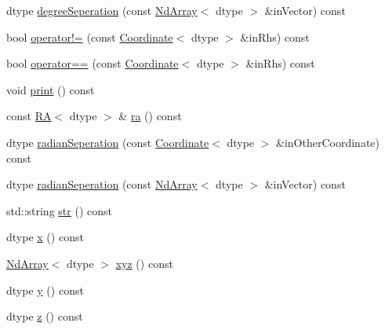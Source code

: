 \begin{DoxyCompactItemize}
\item 
dtype \mbox{\hyperlink{class_num_c_1_1_coordinates_1_1_coordinate_a0623947beab45b718c7da4d3b66ef0b6}{degree\+Seperation}} (const \mbox{\hyperlink{class_num_c_1_1_nd_array}{Nd\+Array}}$<$ dtype $>$ \&in\+Vector) const
\item 
bool \mbox{\hyperlink{class_num_c_1_1_coordinates_1_1_coordinate_a470632051f16f26dc976f5d8d0c24ac5}{operator!=}} (const \mbox{\hyperlink{class_num_c_1_1_coordinates_1_1_coordinate}{Coordinate}}$<$ dtype $>$ \&in\+Rhs) const
\item 
bool \mbox{\hyperlink{class_num_c_1_1_coordinates_1_1_coordinate_a8cb8145a08a9274ef06224dcac937fe8}{operator==}} (const \mbox{\hyperlink{class_num_c_1_1_coordinates_1_1_coordinate}{Coordinate}}$<$ dtype $>$ \&in\+Rhs) const
\item 
void \mbox{\hyperlink{class_num_c_1_1_coordinates_1_1_coordinate_aa0f224ac4f39b97e7f424aaa78d2a6ef}{print}} () const
\item 
const \mbox{\hyperlink{class_num_c_1_1_coordinates_1_1_r_a}{RA}}$<$ dtype $>$ \& \mbox{\hyperlink{class_num_c_1_1_coordinates_1_1_coordinate_a55daf8b43d979586753e89c7cb2a8172}{ra}} () const
\item 
dtype \mbox{\hyperlink{class_num_c_1_1_coordinates_1_1_coordinate_a9c1a2db9589b6454b89d509a608d2a8d}{radian\+Seperation}} (const \mbox{\hyperlink{class_num_c_1_1_coordinates_1_1_coordinate}{Coordinate}}$<$ dtype $>$ \&in\+Other\+Coordinate) const
\item 
dtype \mbox{\hyperlink{class_num_c_1_1_coordinates_1_1_coordinate_ad2a13417b085c7bd98f64f7b47920972}{radian\+Seperation}} (const \mbox{\hyperlink{class_num_c_1_1_nd_array}{Nd\+Array}}$<$ dtype $>$ \&in\+Vector) const
\item 
std\+::string \mbox{\hyperlink{class_num_c_1_1_coordinates_1_1_coordinate_a285c36896b25a82f53ff44abcd971bc2}{str}} () const
\item 
dtype \mbox{\hyperlink{class_num_c_1_1_coordinates_1_1_coordinate_a1e5b9470d0049657b80e6a9e982228fd}{x}} () const
\item 
\mbox{\hyperlink{class_num_c_1_1_nd_array}{Nd\+Array}}$<$ dtype $>$ \mbox{\hyperlink{class_num_c_1_1_coordinates_1_1_coordinate_a18a47b3def2e1c0b25c14048ccba5236}{xyz}} () const
\item 
dtype \mbox{\hyperlink{class_num_c_1_1_coordinates_1_1_coordinate_a3ba1031707be3b25e9dfe070daff620a}{y}} () const
\item 
dtype \mbox{\hyperlink{class_num_c_1_1_coordinates_1_1_coordinate_af7152f284ec30a7dd057b8e1d6cd2176}{z}} () const
\end{DoxyCompactItemize}
